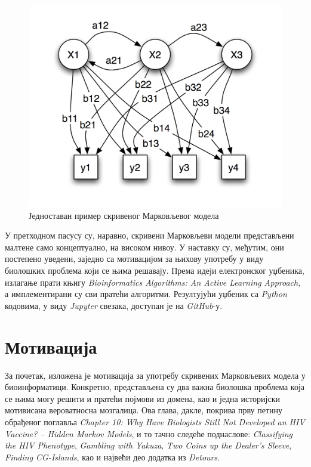 \documentclass[12pt,oneside]{memoir}
\begin{document}
\begin{CJK}{UTF8}{ipxm}
\begin{figure}[!ht]
  \centering
  \includegraphics[width=.75\textwidth]{hmm.png}
  \caption{Једноставан пример скривеног Марковљевог модела\cite{hmm}}
  \label{fig:hmm}
\end{figure}

У претходном пасусу су, наравно, скривени Марковљеви модели представљени малтене само концептуално, на високом нивоу. У наставку су, међутим, они постепено уведени, заједно са мотивацијом за њихову употребу у виду биолошких проблема који се њима решавају. Према идеји електронског уџбеника, излагање прати књигу \textit{Bioinformatics Algorithms: An Active Learning Approach}, а имплементирани су сви пратећи алгоритми. Резултујући уџбеник са \textit{Python} кодовима, у виду \textit{Jupyter} свезака, доступан је на \textit{GitHub}-у\cite{vasovich2021}.

\chapter{Мотивација}
За почетак, изложена је мотивација за употребу скривених Марковљевих модела у биоинформатици. Конкретно, представљена су два важна биолошка проблема која се њима могу решити и пратећи појмови из домена, као и једна историјски мотивисана вероватносна мозгалица. Ова глава, дакле, покрива прву петину обрађеног поглавља \textit{Chapter 10: Why Have Biologists Still Not Developed an HIV Vaccine? -- Hidden Markov Models}, и то тачно следеће поднаслове: \textit{Classifying the HIV Phenotype}, \textit{Gambling with Yakuza}, \textit{Two Coins up the Dealer’s Sleeve}, \textit{Finding CG-Islands}, као и највећи део додатка из \textit{Detours}.


\end{CJK}
\end{document}
